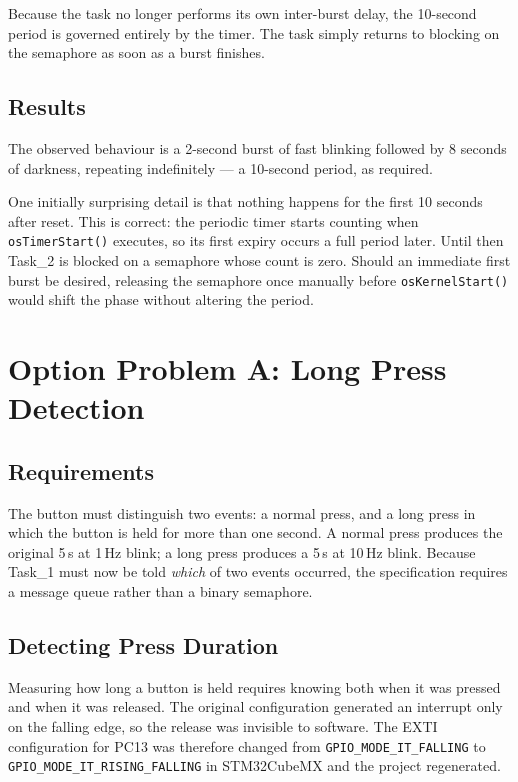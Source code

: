 \documentclass[11pt,a4paper]{article}
\begin{document}
Because the task no longer performs its own inter-burst delay, the 10-second
period is governed entirely by the timer. The task simply returns to blocking
on the semaphore as soon as a burst finishes.

\subsection{Results}

The observed behaviour is a 2-second burst of fast blinking followed by
8 seconds of darkness, repeating indefinitely --- a 10-second period, as
required.

One initially surprising detail is that nothing happens for the first
10 seconds after reset. This is correct: the periodic timer starts counting
when \texttt{osTimerStart()} executes, so its first expiry occurs a full period
later. Until then Task\_2 is blocked on a semaphore whose count is zero.
Should an immediate first burst be desired, releasing the semaphore once
manually before \texttt{osKernelStart()} would shift the phase without altering
the period.

\section{Option Problem A: Long Press Detection}

\subsection{Requirements}

The button must distinguish two events: a normal press, and a long press in
which the button is held for more than one second. A normal press produces the
original 5\,s at 1\,Hz blink; a long press produces a 5\,s at 10\,Hz blink.
Because Task\_1 must now be told \emph{which} of two events occurred, the
specification requires a message queue rather than a binary semaphore.

\subsection{Detecting Press Duration}

Measuring how long a button is held requires knowing both when it was pressed
and when it was released. The original configuration generated an interrupt
only on the falling edge, so the release was invisible to software. The EXTI
configuration for PC13 was therefore changed from
\texttt{GPIO\_MODE\_IT\_FALLING} to \texttt{GPIO\_MODE\_IT\_RISING\_FALLING}
in STM32CubeMX and the project regenerated.
\end{document}
